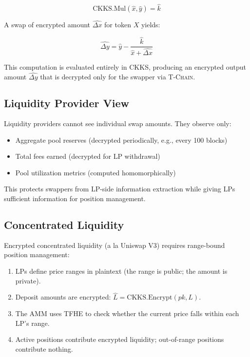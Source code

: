 \documentclass[11pt,letterpaper]{article}
\theoremstyle{definition}
\theoremstyle{remark}
\newcommand{\TChain}{\textsc{T-Chain}}
\newcommand{\TFHE}{\textsc{TFHE}}
\newcommand{\CKKS}{\textsc{CKKS}}
\begin{document}
\begin{equation}
\text{CKKS.Mul}(\hat{x}, \hat{y}) = \hat{k}
\end{equation}

A swap of encrypted amount $\hat{\Delta x}$ for token $X$ yields:

\begin{equation}
\hat{\Delta y} = \hat{y} - \frac{\hat{k}}{\hat{x} + \hat{\Delta x}}
\end{equation}

This computation is evaluated entirely in \CKKS{}, producing an encrypted output amount $\hat{\Delta y}$ that is decrypted only for the swapper via \TChain{}.

\subsection{Liquidity Provider View}

Liquidity providers cannot see individual swap amounts. They observe only:

\begin{itemize}
    \item Aggregate pool reserves (decrypted periodically, e.g., every 100 blocks)
    \item Total fees earned (decrypted for LP withdrawal)
    \item Pool utilization metrics (computed homomorphically)
\end{itemize}

This protects swappers from LP-side information extraction while giving LPs sufficient information for position management.

\subsection{Concentrated Liquidity}

Encrypted concentrated liquidity (a la Uniswap V3) requires range-bound position management:

\begin{enumerate}
    \item LPs define price ranges in plaintext (the range is public; the amount is private).
    \item Deposit amounts are encrypted: $\hat{L} = \text{CKKS.Encrypt}(pk, L)$.
    \item The AMM uses \TFHE{} to check whether the current price falls within each LP's range.
    \item Active positions contribute encrypted liquidity; out-of-range positions contribute nothing.
\end{enumerate}
\end{document}
